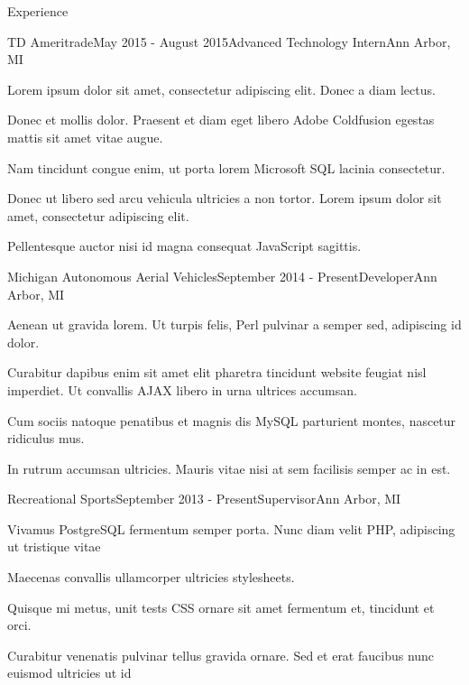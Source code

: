 \documentclass{resume} %
\begin{document}
\begin{rSection}{Experience}

\begin{rSubsection}{TD Ameritrade}{May 2015 - August 2015}{Advanced Technology Intern}{Ann Arbor, MI}
    \item Lorem ipsum dolor sit amet, consectetur adipiscing elit. Donec a diam lectus.
    \item Donec et mollis dolor. Praesent et diam eget libero Adobe Coldfusion egestas mattis sit amet vitae augue.
    \item Nam tincidunt congue enim, ut porta lorem Microsoft SQL lacinia consectetur.
    \item Donec ut libero sed arcu vehicula ultricies a non tortor. Lorem ipsum dolor sit amet, consectetur adipiscing elit.
    \item Pellentesque auctor nisi id magna consequat JavaScript sagittis.
\end{rSubsection}


\begin{rSubsection}{Michigan Autonomous Aerial Vehicles}{September 2014 - Present}{Developer}{Ann Arbor, MI}
\item Aenean ut gravida lorem. Ut turpis felis, Perl pulvinar a semper sed, adipiscing id dolor.
\item Curabitur dapibus enim sit amet elit pharetra tincidunt website feugiat nisl imperdiet. Ut convallis AJAX libero in urna ultrices accumsan.
\item Cum sociis natoque penatibus et magnis dis MySQL parturient montes, nascetur ridiculus mus.
\item In rutrum accumsan ultricies. Mauris vitae nisi at sem facilisis semper ac in est.
\end{rSubsection}


\begin{rSubsection}{Recreational Sports}{September 2013 - Present}{Supervisor}{Ann Arbor, MI}
\item Vivamus PostgreSQL fermentum semper porta. Nunc diam velit PHP, adipiscing ut tristique vitae
\item Maecenas convallis ullamcorper ultricies stylesheets.
\item Quisque mi metus, unit tests CSS ornare sit amet fermentum et, tincidunt et orci.
\item Curabitur venenatis pulvinar tellus gravida ornare. Sed et erat faucibus nunc euismod ultricies ut id
\end{rSubsection}

\end{rSection}
\end{document}

